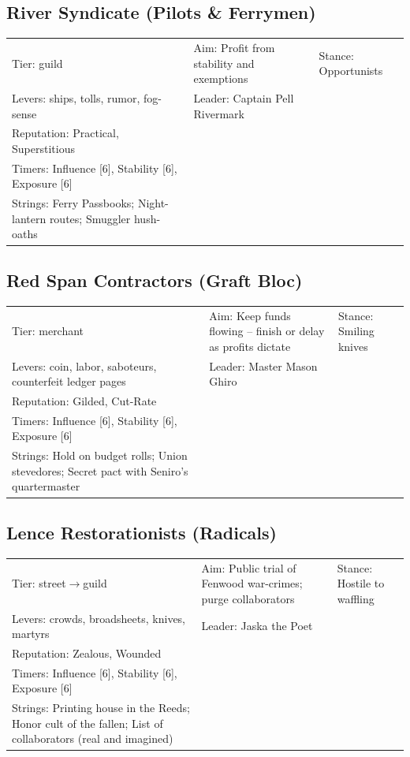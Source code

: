 \documentclass[11pt]{article}
\begin{document}
\subsection*{River Syndicate (Pilots \& Ferrymen)}
\begin{longtable}{@{}lll@{}}
Tier: guild & Aim: Profit from stability and exemptions & Stance: Opportunists \\
Levers: ships, tolls, rumor, fog-sense & Leader: Captain Pell Rivermark & \\
Reputation: Practical, Superstitious & & \\
Timers: Influence [6], Stability [6], Exposure [6] & & \\
Strings: Ferry Passbooks; Night-lantern routes; Smuggler hush-oaths & & \\
\end{longtable}

\subsection*{Red Span Contractors (Graft Bloc)}
\begin{longtable}{@{}lll@{}}
Tier: merchant & Aim: Keep funds flowing -- finish or delay as profits dictate & Stance: Smiling knives \\
Levers: coin, labor, saboteurs, counterfeit ledger pages & Leader: Master Mason Ghiro & \\
Reputation: Gilded, Cut-Rate & & \\
Timers: Influence [6], Stability [6], Exposure [6] & & \\
Strings: Hold on budget rolls; Union stevedores; Secret pact with Seniro's quartermaster & & \\
\end{longtable}

\subsection*{Lence Restorationists (Radicals)}
\begin{longtable}{@{}lll@{}}
Tier: street$\rightarrow$guild & Aim: Public trial of Fenwood war-crimes; purge collaborators & Stance: Hostile to waffling \\
Levers: crowds, broadsheets, knives, martyrs & Leader: Jaska the Poet & \\
Reputation: Zealous, Wounded & & \\
Timers: Influence [6], Stability [6], Exposure [6] & & \\
Strings: Printing house in the Reeds; Honor cult of the fallen; List of collaborators (real and imagined) & & \\
\end{longtable}
\end{document}
